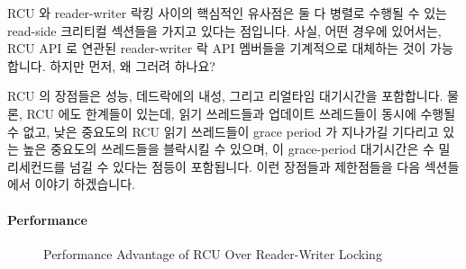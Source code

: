 RCU 와 reader-writer 락킹 사이의 핵심적인 유사점은 둘 다 병렬로 수행될 수 있는
read-side 크리티컬 섹션들을 가지고 있다는 점입니다.
사실, 어떤 경우에 있어서는, RCU API 로 연관된 reader-writer 락 API 멤버들을
기계적으로 대체하는 것이 가능합니다.
하지만 먼저, 왜 그러려 하나요?

RCU 의 장점들은 성능, 데드락에의 내성, 그리고 리얼타임 대기시간을 포함합니다.
물론, RCU 에도 한계들이 있는데, 읽기 쓰레드들과 업데이트 쓰레드들이 동시에
수행될 수 없고, 낮은 중요도의 RCU 읽기 쓰레드들이 grace period 가 지나가길
기다리고 있는 높은 중요도의 쓰레드들을 블락시킬 수 있으며, 이 grace-period
대기시간은 수 밀리세컨드를 넘길 수 있다는 점등이 포함됩니다.
이런 장점들과 제한점들을 다음 섹션들에서 이야기 하겠습니다.

\paragraph{Performance}

\begin{figure}[tb]
\begin{center}
\end{center}
\caption{Performance Advantage of RCU Over Reader-Writer Locking}
\label{fig:defer:Performance Advantage of RCU Over Reader-Writer Locking}
\end{figure}

